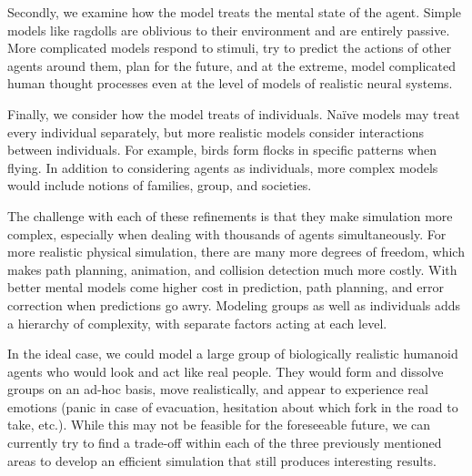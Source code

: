 \documentclass[tog]{acmsiggraph}
\begin{document}
Secondly, we examine how the model treats the mental state of the agent. Simple models like ragdolls are oblivious to their environment and are entirely passive. More complicated models respond to stimuli, try to predict the actions of other agents around them, plan for the future, and at the extreme, model complicated human thought processes even at the level of models of realistic neural systems.

Finally, we consider how the model treats 
of individuals. Na\"ive models may treat every individual separately, but more realistic models consider interactions between individuals. For example, birds form flocks in specific patterns when flying. %
In addition to considering agents as individuals, more complex models would include notions of families, group, and societies.

The challenge with each of these refinements is that they make simulation more complex, especially when dealing with thousands of agents simultaneously. For more realistic physical simulation, there are many more degrees of freedom, which makes path planning, animation, and collision detection much more costly. With better mental models come higher cost in prediction, path planning, and error correction when predictions go awry. Modeling groups as well as individuals adds a hierarchy of complexity, with separate factors acting at each level.

In the ideal case, we could model a large group of biologically realistic humanoid agents who would look and act like real people. They would form and dissolve groups on an ad-hoc basis, move realistically, and appear to experience real emotions (panic in case of evacuation, hesitation about which fork in the road to take, etc.). While this may not be feasible for the foreseeable future, we can currently try to find a trade-off within each of the three previously mentioned areas to develop an efficient simulation that still produces interesting results.
\end{document}
